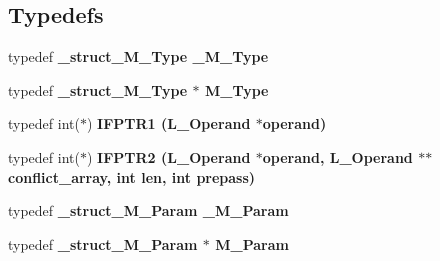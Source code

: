 \subsection*{Typedefs}
\begin{CompactItemize}
\item 
typedef \bf{\_\-struct\_\-M\_\-Type} \bf{\_\-M\_\-Type}
\item 
typedef \bf{\_\-struct\_\-M\_\-Type} $\ast$ \bf{M\_\-Type}
\item 
typedef int($\ast$) \bf{IFPTR1} (L\_\-Operand $\ast$operand)
\item 
typedef int($\ast$) \bf{IFPTR2} (L\_\-Operand $\ast$operand, L\_\-Operand $\ast$$\ast$conflict\_\-array, int len, int prepass)
\item 
typedef \bf{\_\-struct\_\-M\_\-Param} \bf{\_\-M\_\-Param}
\item 
typedef \bf{\_\-struct\_\-M\_\-Param} $\ast$ \bf{M\_\-Param}
\end{CompactItemize}
